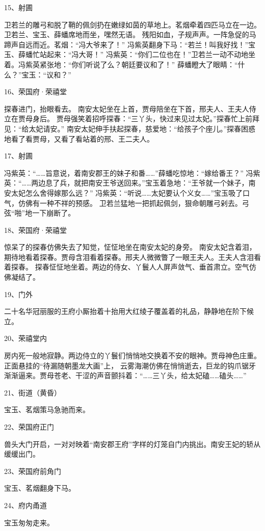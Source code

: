 15、射圃\par
卫若兰的雕弓和脱了鞘的佩剑扔在嫩绿如茵的草地上。茗烟牵着四匹马立在一边。卫若兰、宝玉、薛蟠席地而坐，嘿然无语。
残阳如血，子规声声。一阵急促的马蹄声自远而近。茗烟：“冯大爷来了！”
冯紫英翻身下马：“若兰！叫我好找！”宝玉、薛蟠忙站起来：“冯大哥！”
冯紫英：“你们二位也在！”卫若兰一动不动地坐着。冯紫英紧张地：“你们听说了么？朝廷要议和了！”
薛蟠瞪大了眼睛：“什么？”宝玉：“议和？” 

16、荣国府·荣禧堂\par

探春进门，抬眼看去。
南安太妃坐在上首，贾母陪坐在下首，邢夫人、王夫人侍立在贾母身后。
贾母强笑着招呼探春：“三丫头，快过来见过太妃。”探春忙上前拜见：“给太妃请安。”
南安太妃伸手扶起探春，慈爱地：“给孩子个座儿。”探春困惑地看了看贾母，又看了看站着的邢、王二夫人。

17、射圃\par
冯紫英：“……旨意说，着南安郡王的妹子和番……”薛蟠吃惊地：“嫁给番王？”
冯紫英：“……两边息了兵，就把南安王爷送回来。”宝玉着急地：“王爷就一个妹子，南安太妃怎么舍得嫁那么远？”
冯紫英：“听说……太妃要认个义女……”宝玉吸了口气，仿佛有一种不祥的预感。
卫若兰猛地一把抓起佩剑，狠命朝雕弓剁去。弓弦“啪”地一下崩断了。

18、荣国府·荣禧堂\par
惊呆了的探春仿佛失去了知觉，怔怔地坐在南安太妃的身旁。
南安太妃含着泪，期待地看着探春。贾母含泪看着探春。邢夫人微微瞥了一眼王夫人。王夫人含泪看着探春。
探春怔怔地坐着。两边的侍女、丫鬟人人屏声敛气、垂首肃立。空气仿佛凝结了。

19、门外\par
二十名华冠丽服的王府小厮抬着十抬用大红绫子覆盖着的礼品，静静地在阶下候立。

20、荣禧堂内\par
房内死一般地寂静。两边侍立的丫鬟们悄悄地交换着不安的眼神。贾母神色庄重。正面悬挂的“待漏随朝墨龙大画”上，
云雾海潮仿佛在悄悄逝去，巨龙的钩爪锯牙渐渐逼来。贾母苍老、干涩的声音颤抖着：“……三丫头，给太妃磕……磕头……”

21、街道（黄昏）\par
宝玉、茗烟策马急驰而来。

22、荣国府正门\par
兽头大门开启，一对对映着“南安郡王府”字样的灯笼自门内挑出。南安王妃的轿从缓缓出门。

23、荣国府前角门\par
宝玉、茗烟翻身下马。

24、府内甬道\par
宝玉匆匆走来。 

